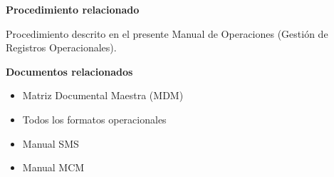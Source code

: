 \begin{tcolorbox}[title=Documentos asociados,colback=gray!5,colframe=black]

\textbf{Procedimiento relacionado}

Procedimiento descrito en el presente Manual de Operaciones (Gestión de Registros Operacionales).

\vspace{0.3cm}

\textbf{Documentos relacionados}

\begin{itemize}

\item Matriz Documental Maestra (MDM)

\item Todos los formatos operacionales

\item Manual SMS

\item Manual MCM

\end{itemize}

\end{tcolorbox}


